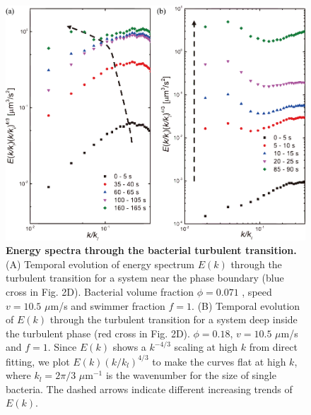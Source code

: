 \begin{figure}[!ht]
	\begin{center}
	\includegraphics[width=5.5 in]{Figs/4-Emergence/5.pdf}
	\end{center}
	\caption[Energy spectra through the bacterial turbulent transition]
	{
	\textbf{Energy spectra through the bacterial turbulent transition.}
   (A) Temporal evolution of energy spectrum $E(k)$ through the turbulent transition for a system near the phase boundary (blue cross in Fig. 2D). Bacterial volume fraction $\phi= 0.071$ , speed $v = 10.5$ $\mu$m/s and swimmer fraction $f = 1$.
   (B) Temporal evolution of $E(k)$ through the turbulent transition for a system deep inside the turbulent phase (red cross in Fig. 2D). $\phi = 0.18$, $v = 10.5$ $\mu$m/s and $f = 1$. Since $E(k)$ shows a $k^{-4/3}$ scaling at high $k$ from direct fitting, we plot $E(k)(k/k_l)^{4/3}$ to make the curves flat at high $k$, where $k_l = 2\pi/3$ $\mu$m$^{-1}$ is the wavenumber for the size of single bacteria. The dashed arrows indicate different increasing trends of $E(k)$.
	}
	\label{fig:4-spectra}
\end{figure}

